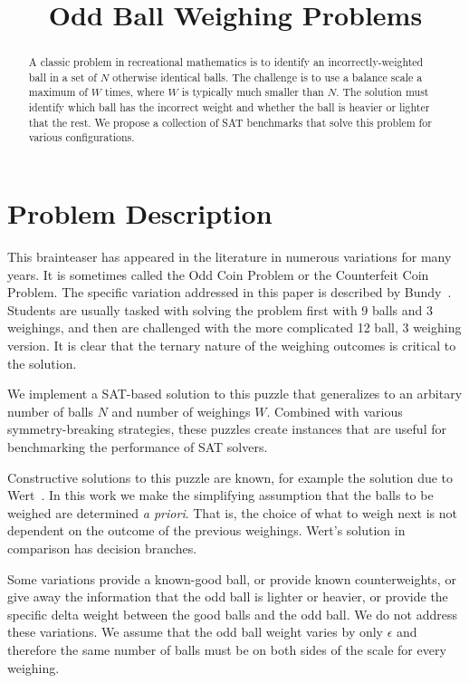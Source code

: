 \documentclass[conference]{IEEEtran}
\begin{document}
\title{Odd Ball Weighing Problems}

\author{
}

\maketitle

\begin{abstract}
A classic problem in recreational mathematics is to identify an incorrectly-weighted ball in a set of $N$ otherwise identical balls.
The challenge is to use a balance scale a maximum of $W$ times, where $W$ is typically much smaller than $N$.
The solution must identify which ball has the incorrect weight and whether the ball is heavier or lighter that the rest.
We propose a collection of SAT benchmarks that solve this problem for various configurations.
\end{abstract}

\section{Problem Description}

This brainteaser has appeared in the literature in numerous variations for many years.
It is sometimes called the Odd Coin Problem or the Counterfeit Coin Problem.
The specific variation addressed in this paper is described by Bundy~\cite{b2}.
Students are usually tasked with solving the problem first with 9 balls and 3 weighings,
and then are challenged with the more complicated 12 ball, 3 weighing version.
It is clear that the ternary nature of the weighing outcomes is critical to the solution.

We implement a SAT-based solution to this puzzle that generalizes to an arbitary number of balls $N$ and number of weighings $W$.
Combined with various symmetry-breaking strategies, these puzzles create instances that are useful for benchmarking
the performance of SAT solvers.

Constructive solutions to this puzzle are known, for example the solution due to Wert~\cite{b3}.
In this work we make the simplifying assumption that the balls to be weighed are determined \emph{a priori}. That is,
the choice of what to weigh next is not dependent on the outcome of the previous weighings.
Wert's solution in comparison has decision branches.

Some variations provide a known-good ball, or provide known counterweights, or give away the information that the odd ball
is lighter or heavier, or provide the specific delta weight between the good balls and the odd ball.
We do not address these variations.
We assume that the odd ball weight varies by only $\epsilon$ and therefore the same number of balls must be on both sides of the scale
for every weighing.
\end{document}
